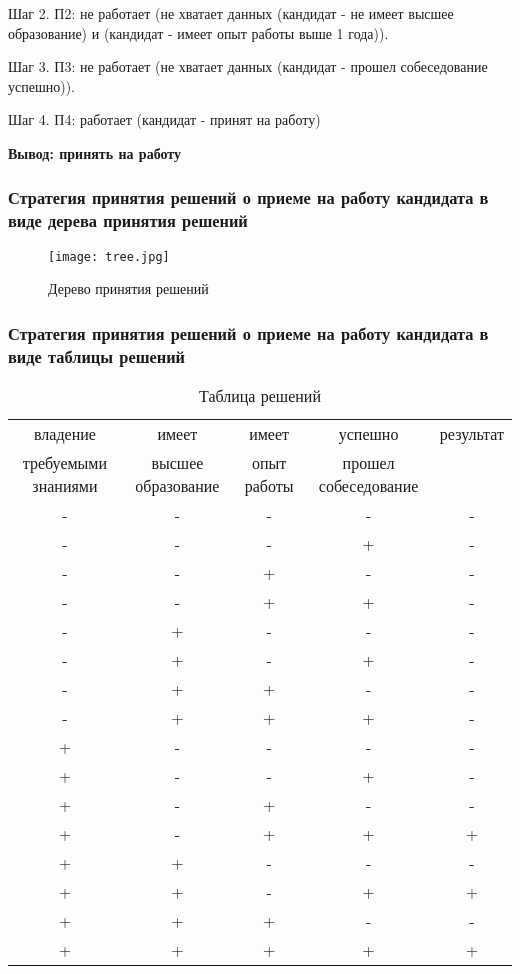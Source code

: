 \documentclass[14pt,a4paper,report]{report}
\begin{document}
Шаг 2. П2: не работает (не хватает данных (кандидат - не имеет высшее образование) и (кандидат - имеет опыт работы выше 1 года)).

Шаг 3. П3: не работает (не хватает данных (кандидат - прошел собеседование успешно)).

Шаг 4. П4:  работает (кандидат - принят на работу)

\textbf{Вывод: принять на работу}

\subsubsection{Стратегия принятия решений о приеме на работу кандидата в виде дерева принятия решений}

\begin{figure}[h!]
\centering
\texttt{[image: tree.jpg]}
\caption{Дерево принятия решений}
\label{image:2}
\end{figure}

\clearpage

\subsubsection{Стратегия принятия решений о приеме на работу кандидата в виде таблицы решений}

\begin{table}[h!]
\centering
\bgroup
\def\arraystretch{1}
\begin{tabular}{ | c| c | c |c |c | }
\hline
владение & имеет  & имеет  & успешно  & результат \\
требуемыми знаниями & высшее образование & опыт работы & прошел собеседование & \\ \hline

- & - & - & - & - \\ \hline 
- & - & - & + & - \\ \hline
- & - & + & - & - \\ \hline 
- & - & + & + & - \\ \hline

- & + & - & - & - \\ \hline 
- & + & - & + & - \\ \hline
- & + & + & - & - \\ \hline 
- & + & + & + & - \\ \hline

+ & - & - & - & - \\ \hline
+ & - & - & + & - \\ \hline
+ & - & + & - & - \\ \hline
+ & - & + & + & + \\ \hline

+ & + & - & - & - \\ \hline
+ & + & - & + & + \\ \hline
+ & + & + & - & - \\ \hline
+ & + & + & + & + \\ \hline
\end{tabular}
\egroup
\caption{Таблица решений}
\label{table:1}
\end{table}
\end{document}

